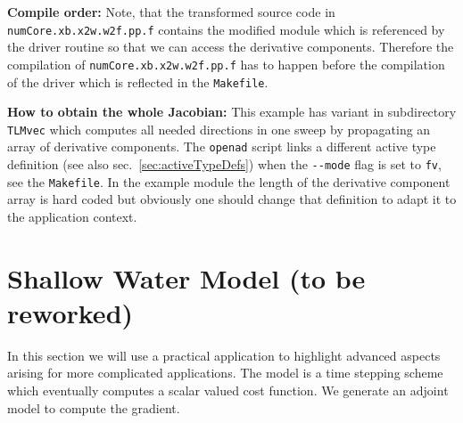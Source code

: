 \documentclass{book}
\newcommand{\refsec}[1]{{sec.~\ref{#1}}}
\begin{document}
\noindent
{\bf Compile order:} Note, that the transformed source code in \lstinline{numCore.xb.x2w.w2f.pp.f} 
contains the modified module which is referenced by the driver routine so that we can access the derivative
components. Therefore the compilation of \lstinline{numCore.xb.x2w.w2f.pp.f} has to happen before 
the compilation of the driver which is reflected in the \lstinline{Makefile}.

\noindent
{\bf How to obtain the whole Jacobian:} This example has variant in subdirectory \lstinline{TLMvec} which 
computes all needed directions in one sweep by propagating an array of derivative components.  
The \lstinline{openad} script links a different active type definition (see also \refsec{sec:activeTypeDefs})
when the \lstinline{--mode} flag is set to \lstinline{fv}, see the \lstinline{Makefile}.
In the example module the length of the derivative component array is hard coded but obviously one should  
change that definition to adapt it to the application context. 

\section{Shallow Water Model (to be reworked)}\label{sec:shallow}
In this section we will use a practical application to highlight 
advanced aspects arising for more complicated applications. 
The model is a time stepping scheme which eventually computes 
a scalar valued cost function. We generate an adjoint model 
to compute the gradient.  

\end{document}
